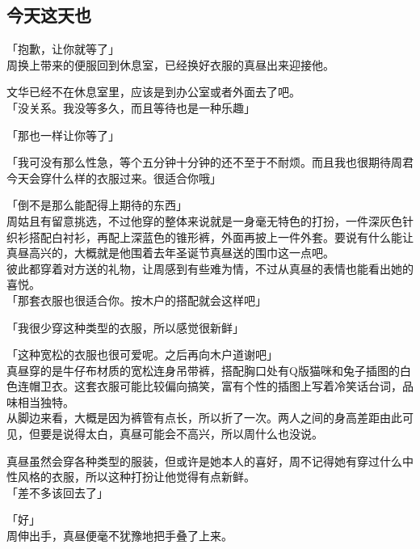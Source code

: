 \subsection{今天这天也}

「抱歉，让你就等了」\\

周换上带来的便服回到休息室，已经换好衣服的真昼出来迎接他。

文华已经不在休息室里，应该是到办公室或者外面去了吧。\\

「没关系。我没等多久，而且等待也是一种乐趣」

「那也一样让你等了」

「我可没有那么性急，等个五分钟十分钟的还不至于不耐烦。而且我也很期待周君今天会穿什么样的衣服过来。很适合你哦」

「倒不是那么能配得上期待的东西」\\

周姑且有留意挑选，不过他穿的整体来说就是一身毫无特色的打扮，一件深灰色针织衫搭配白衬衫，再配上深蓝色的锥形裤，外面再披上一件外套。要说有什么能让真昼高兴的，大概就是他围着去年圣诞节真昼送的围巾这一点吧。\\

彼此都穿着对方送的礼物，让周感到有些难为情，不过从真昼的表情也能看出她的喜悦。\\

「那套衣服也很适合你。按木户的搭配就会这样吧」

「我很少穿这种类型的衣服，所以感觉很新鲜」

「这种宽松的衣服也很可爱呢。之后再向木户道谢吧」\\

真昼穿的是牛仔布材质的宽松连身吊带裤，搭配胸口处有Q版猫咪和兔子插图的白色连帽卫衣。这套衣服可能比较偏向搞笑，富有个性的插图上写着冷笑话台词，品味相当独特。\\

从脚边来看，大概是因为裤管有点长，所以折了一次。两人之间的身高差距由此可见，但要是说得太白，真昼可能会不高兴，所以周什么也没说。

真昼虽然会穿各种类型的服装，但或许是她本人的喜好，周不记得她有穿过什么中性风格的衣服，所以这种打扮让他觉得有点新鲜。\\

「差不多该回去了」

「好」\\

周伸出手，真昼便毫不犹豫地把手叠了上来。\\

